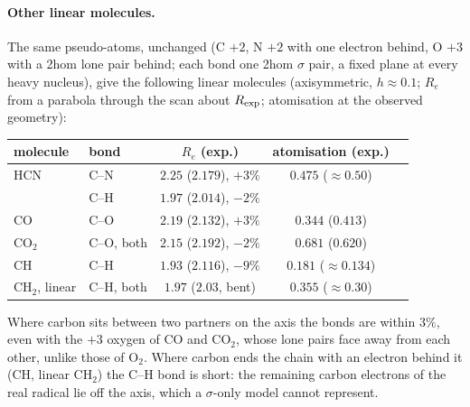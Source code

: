 \documentclass[11pt]{article}
\begin{document}
\paragraph{Other linear molecules.} The same pseudo-atoms, unchanged (C $+2$, N $+2$ with one
electron behind, O $+3$ with a 2hom lone pair behind; each bond one 2hom $\sigma$ pair, a fixed plane
at every heavy nucleus), give the following linear molecules (axisymmetric, $h \approx 0.1$; $R_e$
from a parabola through the scan about $R_{\rm exp}$; atomisation at the observed geometry):
\begin{center}
\small
\begin{tabular}{llccc}
\toprule
molecule & bond & $R_e$ (exp.) & atomisation (exp.) \\
\midrule
HCN      & C--N & $2.25$ ($2.179$), $+3\%$ & $0.475$ ($\approx0.50$) \\
         & C--H & $1.97$ ($2.014$), $-2\%$ & \\
CO       & C--O & $2.19$ ($2.132$), $+3\%$ & $0.344$ ($0.413$) \\
CO$_2$   & C--O, both & $2.15$ ($2.192$), $-2\%$ & $0.681$ ($0.620$) \\
CH       & C--H & $1.93$ ($2.116$), $-9\%$ & $0.181$ ($\approx0.134$) \\
CH$_2$, linear & C--H, both & $1.97$ ($2.03$, bent) & $0.355$ ($\approx0.30$) \\
\bottomrule
\end{tabular}
\end{center}
Where carbon sits between two partners on the axis the bonds are within $3\%$, even with the
$+3$ oxygen of CO and CO$_2$, whose lone pairs face away from each other, unlike those of O$_2$. Where
carbon ends the chain with an electron behind it (CH, linear CH$_2$) the C--H bond is short: the
remaining carbon electrons of the real radical lie off the axis, which a $\sigma$-only model cannot
represent.
\end{document}
